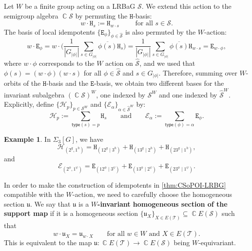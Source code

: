 \documentclass[11pt, oneside, reqno]{amsart}
\theoremstyle{definition}
\newtheorem{example}[theorem]{Example}
\numberwithin{equation}{section}
\DeclareMathOperator{\C}{\mathbb{C}}
\newcommand{\defn}[1]{{\color{RoyalBlue}\bf#1}}
\def \SS{{\mathcal{S}}}
\def \TT{{\mathcal{T}}}
\def \kk{\C}
\def \ol{\overline}
\def \uu{{\mathfrak{u}}}
\def \wh{\widehat}
\def\qqand{\qquad\text{and}\qquad}
\def \type{\mathsf{type}}
\newcommand{\B}[1]{\mathtt{#1}} 			%
\newcommand{\SB}[1]{\mathcal{#1}} 		%
\newcommand{\abs}[1]{|{#1}|} 				%
\begin{document}
Let $W$ be a finite group acting on a LRBaG $\SS$.
We extend this action to the semigroup algebra $\kk \SS$ by permuting the $\B{H}$-basis:
\[
    w \cdot \B{H}_s := \B{H}_{w \cdot s} \qquad\text{ for all } s \in \SS.
\]
The basis of local idempotents $\{\B{E}_\phi\}_{\phi \in \wh{\SS}}$ is also permuted by the $W$-action:
\[
    w \cdot \B{E}_\phi
    = w \cdot \Big( \dfrac{1}{|G_{\abs{\phi}}|} \sum_{s \in G_{\abs{\phi}}} \ol{\phi(s)} \B{H}_s \Big)
    = \dfrac{1}{|G_{\abs{\phi}}|} \sum_{s \in G_{\abs{\phi}}} \ol{\phi(s)} \B{H}_{w \cdot s}
    = \B{E}_{w \cdot \phi},
\]
where $w \cdot \phi$ corresponds to the $W$ action on $\wh{\SS}$,
and we used that $\phi(s) = (w \cdot \phi)(w \cdot s)$ for all $\phi \in \wh{\SS}$ and $s \in G_{\abs{\phi}}$.
Therefore, summing over $W$-orbits of the $\B{H}$-basis and the $\B{E}$-basis,
we obtain two different bases for the invariant subalgebra $(\kk \SS)^W$, one indexed by $\SS^W$ and one indexed by $\wh{\SS}^W$.
Explicitly, define $\{\SB{H}_p\}_{p \in \SS^W}$ and $\{ \SB{E}_\alpha \}_{\alpha \in \wh{\SS}^W}$ by:
\begin{equation}\label{eq:def-symH-basis}
        \SB{H}_p := \sum_{\type(s) = p} \B{H}_s
    \qqand
    \SB{E}_\alpha := \sum_{\type(\phi) = \alpha} \B{E}_\phi.
\end{equation}
\begin{example}
    In $\Sigma_3[G]$, we have
    \[
        \SB{H}_{( 2^g , 1^h )} =
        \B{H}_ {( 12^g \mid 3^h )} + 
        \B{H}_ {( 13^g \mid 2^h )} + 
        \B{H}_ {( 23^g \mid 1^h )},
    \]
    and
    \[
        \SB{E}_{( 2^\phi , 1^\psi )} =
        \B{E}_ {( 12^\phi \mid 3^\psi )} + 
        \B{E}_ {( 13^\phi \mid 2^\psi )} + 
        \B{E}_ {( 23^\phi \mid 1^\psi )}.
    \]
\end{example}

In order to make the construction of idempotents in \cref{thm:CSoPOI-LRBG} compatible with the $W$-action, we need to carefully choose the homogeneous section $\uu$.
We say that $\uu$ is a \defn{$W$-invariant homogeneous section of the support map} if it is a homogeneous section
$\{\uu_X\}_{X \in E(\TT)} \subseteq \kk E(\SS)$ such that
\[
    w \cdot \uu_X = \uu_{w \cdot X}
    \qquad
    \text{for all }w \in W \text{ and } X \in E(\TT).
\]
This is equivalent to the map $\uu : \kk E(\TT) \to \kk E(\SS)$ being $W$-equivariant.
\end{document}
